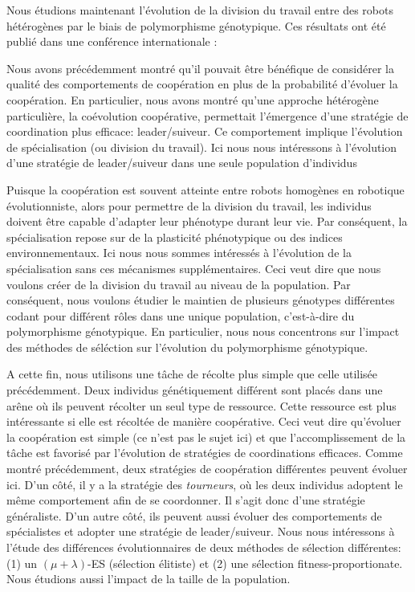 			Nous étudions maintenant l'évolution de la division du travail entre des robots hétérogènes par le biais de polymorphisme génotypique. Ces résultats ont été publié dans une conférence internationale :

			\begin{quote}
			\end{quote}

			Nous avons précédemment montré qu'il pouvait être bénéfique de considérer la qualité des comportements de coopération en plus de la probabilité d'évoluer la coopération. En particulier, nous avons montré qu'une approche hétérogène particulière, la coévolution coopérative, permettait l'émergence d'une stratégie de coordination plus efficace: leader/suiveur. Ce comportement implique l'évolution de spécialisation (ou division du travail). Ici nous nous intéressons à l'évolution d'une stratégie de leader/suiveur dans une seule population d'individus

			Puisque la coopération est souvent atteinte entre robots homogènes en robotique évolutionniste, alors pour permettre de la division du travail, les individus doivent être capable d'adapter leur phénotype durant leur vie. Par conséquent, la spécialisation repose sur de la plasticité phénotypique ou des indices environnementaux. Ici nous nous sommes intéressés à l'évolution de la spécialisation sans ces mécanismes supplémentaires. Ceci veut dire que nous voulons créer de la division du travail au niveau de la population. Par conséquent, nous voulons étudier le maintien de plusieurs génotypes différentes codant pour différent rôles dans une unique population, c'est-à-dire du polymorphisme génotypique. En particulier, nous nous concentrons sur l'impact des méthodes de séléction sur l'évolution du polymorphisme génotypique.

			A cette fin, nous utilisons une tâche de récolte plus simple que celle utilisée précédemment. Deux individus génétiquement différent sont placés dans une arêne où ils peuvent récolter un seul type de ressource. Cette ressource est plus intéressante si elle est récoltée de manière coopérative. Ceci veut dire qu'évoluer la coopération est simple (ce n'est pas le sujet ici) et que l'accomplissement de la tâche est favorisé par l'évolution de stratégies de coordinations efficaces. Comme montré précédemment, deux stratégies de coopération différentes peuvent évoluer ici. D'un côté, il y a la stratégie des \emph{tourneurs}, où les deux individus adoptent le même comportement afin de se coordonner. Il s'agit donc d'une stratégie généraliste. D'un autre côté, ils peuvent aussi évoluer des comportements de spécialistes et adopter une stratégie de leader/suiveur. Nous nous intéressons à l'étude des différences évolutionnaires de deux méthodes de sélection différentes: (1) un \((\mu + \lambda)\)-ES (sélection élitiste) et (2) une sélection fitness-proportionate. Nous étudions aussi l'impact de la taille de la population.

